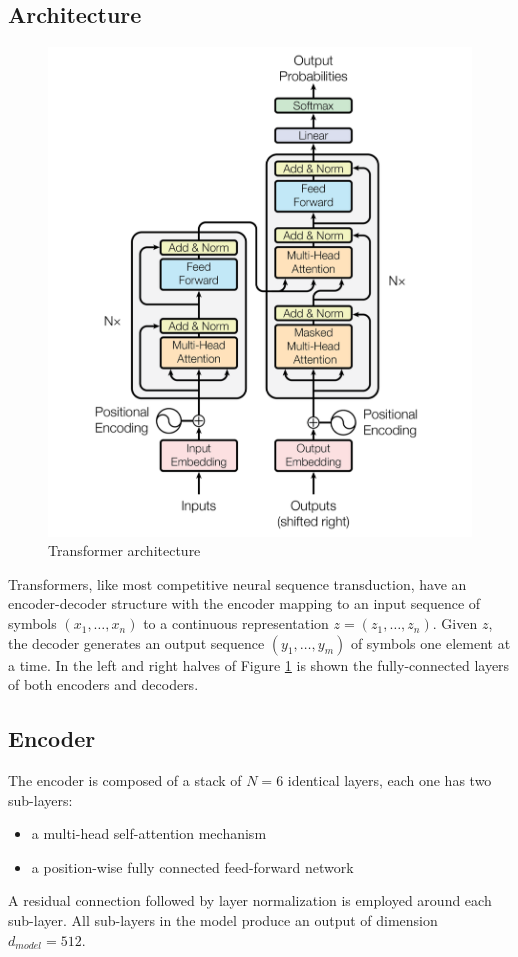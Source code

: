 \documentclass[\main/main.tex]{subfiles}
\begin{document}
\subsection{Architecture}
\begin{figure}[h]
    \centering
    \includegraphics[scale=0.35]{images/transformer/transformer_model_architecture.png}
    \caption{Transformer architecture}
    \label{fig:transformer_architecture}
\end{figure}

Transformers, like most competitive neural sequence transduction, have an encoder-decoder structure with the encoder mapping to an input sequence of symbols $(x_1, \dots, x_n)$ to a continuous representation $z = (z_1, \dots, z_n)$. Given $z$, the decoder generates an output sequence $(y_1, \dots, y_m)$ of symbols one element at a time. In the left and right halves of Figure \ref{fig:transformer_architecture} is shown the fully-connected layers of both encoders and decoders.
\subsection{Encoder}
The encoder is composed of a stack of $N=6$ identical layers, each one has two sub-layers:
\begin{itemize}
    \item a multi-head self-attention mechanism
    \item a position-wise fully connected feed-forward network
\end{itemize}
A residual connection followed by layer normalization is employed around each sub-layer. All sub-layers in the model produce an output of dimension $d_{model} = 512$.
\end{document}
